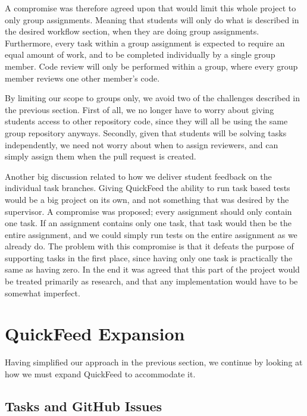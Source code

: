 A compromise was therefore agreed upon that would limit this whole project to only group assignments.
Meaning that students will only do what is described in the desired workflow section, when they are doing group assignments.
Furthermore, every task within a group assignment is expected to require an equal amount of work, and to be completed individually by a single group member.
Code review will only be performed within a group, where every group member reviews one other member's code.

By limiting our scope to groups only, we avoid two of the challenges described in the previous section.
First of all, we no longer have to worry about giving students access to other repository code, since they will all be using the same group repository anyways.
Secondly, given that students will be solving tasks independently, we need not worry about when to assign reviewers, and can simply assign them when the pull request is created.

Another big discussion related to how we deliver student feedback on the individual task branches.
Giving QuickFeed the ability to run task based tests would be a big project on its own, and not something that was desired by the supervisor. 
A compromise was proposed; every assignment should only contain one task.
If an assignment contains only one task, that task would then be the entire assignment, and we could simply run tests on the entire assignment as we already do.
The problem with this compromise is that it defeats the purpose of supporting tasks in the first place, since having only one task is practically the same as having zero.
In the end it was agreed that this part of the project would be treated primarily as research, and that any implementation would have to be somewhat imperfect.


\section{QuickFeed Expansion}

Having simplified our approach in the previous section, we continue by looking at how we must expand QuickFeed to accommodate it.

\subsection{Tasks and GitHub Issues}


